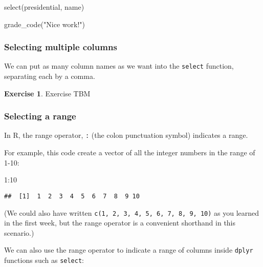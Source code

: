 \documentclass[
]{article}
\newenvironment{Shaded}{\begin{snugshade}}{\end{snugshade}}
\newcommand{\DecValTok}[1]{\textcolor[rgb]{0.00,0.00,0.81}{#1}}
\newcommand{\FunctionTok}[1]{\textcolor[rgb]{0.00,0.00,0.00}{#1}}
\newcommand{\NormalTok}[1]{#1}
\newcommand{\SpecialCharTok}[1]{\textcolor[rgb]{0.00,0.00,0.00}{#1}}
\newcommand{\StringTok}[1]{\textcolor[rgb]{0.31,0.60,0.02}{#1}}
\theoremstyle{definition}
\theoremstyle{definition}
\theoremstyle{definition}
\newtheorem{exercise}{Exercise}[section]
\theoremstyle{definition}
\theoremstyle{remark}
\begin{document}
\begin{Shaded}
\begin{Highlighting}[]
\FunctionTok{select}\NormalTok{(presidential, name)}
\end{Highlighting}
\end{Shaded}

\begin{Shaded}
\begin{Highlighting}[]
\FunctionTok{grade\_code}\NormalTok{(}\StringTok{"Nice work!"}\NormalTok{)}
\end{Highlighting}
\end{Shaded}

\hypertarget{selecting-multiple-columns}{%
\subsubsection{Selecting multiple columns}\label{selecting-multiple-columns}}

We can put as many column names as we want into the \texttt{select} function, separating each by a comma.

\begin{exercise}
Exercise TBM
\end{exercise}

\hypertarget{selecting-a-range}{%
\subsubsection{Selecting a range}\label{selecting-a-range}}

In R, the range operator, \texttt{:} (the colon punctuation symbol) indicates a range.

For example, this code create a vector of all the integer numbers in the range of 1-10:

\begin{Shaded}
\begin{Highlighting}[]
\DecValTok{1}\SpecialCharTok{:}\DecValTok{10}
\end{Highlighting}
\end{Shaded}

\begin{verbatim}
##  [1]  1  2  3  4  5  6  7  8  9 10
\end{verbatim}

(We could also have written \texttt{c(1,\ 2,\ 3,\ 4,\ 5,\ 6,\ 7,\ 8,\ 9,\ 10)} as you learned in the first week, but the range operator is a convenient shorthand in this scenario.)

We can also use the range operator to indicate a range of columns inside \texttt{dplyr} functions such as \texttt{select}:
\end{document}
